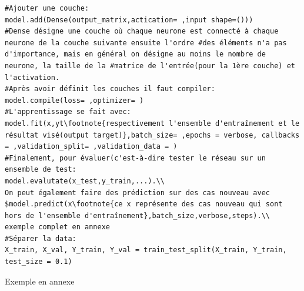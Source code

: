 \documentclass[openany,14pt,fleqn]{book} %
\begin{document}
\begin{lstlisting}
#Ajouter une couche:
model.add(Dense(output_matrix,actication= ,input shape=()))
#Dense désigne une couche où chaque neurone est connecté à chaque neurone de la couche suivante ensuite l'ordre #des éléments n'a pas d'importance, mais en général on désigne au moins le nombre de neurone, la taille de la #matrice de l'entrée(pour la 1ère couche) et l'activation.
#Après avoir définit les couches il faut compiler:
model.compile(loss= ,optimizer= )
#L'apprentissage se fait avec:
model.fit(x,yt\footnote{respectivement l'ensemble d'entraînement et le résultat visé(output target)},batch_size= ,epochs = verbose, callbacks = ,validation_split= ,validation_data = )
#Finalement, pour évaluer(c'est-à-dire tester le réseau sur un ensemble de test:
model.evalutate(x_test,y_train,...).\\ 
On peut également faire des prédiction sur des cas nouveau avec $model.predict(x\footnote{ce x représente des cas nouveau qui sont hors de l'ensemble d'entraînement},batch_size,verbose,steps).\\
exemple complet en annexe
#Séparer la data:
X_train, X_val, Y_train, Y_val = train_test_split(X_train, Y_train, test_size = 0.1)
\end{lstlisting}
Exemple en annexe

 
\end{document}
